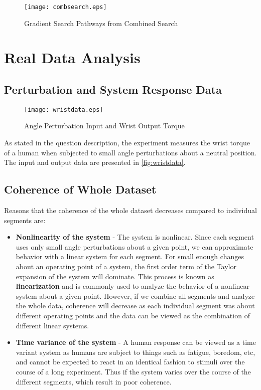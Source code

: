 \documentclass[11pt,a4paper]{article}
\begin{document}
\begin{figure}
    \centering
    \texttt{[image: combsearch.eps]}
    \caption{Gradient Search Pathways from Combined Search}
    \label{fig:combsearch}
\end{figure}

\newpage
{}


\section{Real Data Analysis}

\subsection{Perturbation and System Response Data}
\begin{figure}
    \centering
    \texttt{[image: wristdata.eps]}
    \caption{Angle Perturbation Input and Wrist Output Torque}
    \label{fig:wristdata}
\end{figure}
As stated in the question description, the experiment measures the wrist torque
of a human when subjected to small angle perturbations about a neutral
position. The input and output data are presented in \autoref{fig:wristdata}.

\subsection{Coherence of Whole Dataset}
Reasons that the coherence of the whole dataset decreases compared to
individual segments are:
\begin{itemize}
    \item \textbf{Nonlinearity of the system} - The system is nonlinear. Since
        each segment uses only small angle perturbations about a given point,
        we can approximate behavior with a linear system for each segment. For
        small enough changes about an operating point of a system, the first
        order term of the Taylor expansion of the system will dominate. This
        process is known as \textbf{linearization} and is commonly used to
        analyze the behavior of a nonlinear system about a given point.
        However, if we combine all segments and analyze the whole data,
        coherence will decrease as each individual segment was about different
        operating points and the data can be viewed as the combination of
        different linear systems.
    \item \textbf{Time variance of the system} - A human response can be viewed
        as a time variant system as humans are subject to things such as
        fatigue, boredom, etc, and cannot be expected to react in an identical
        fashion to stimuli over the course of a long experiment. Thus if the
        system varies over the course of the different segments, which result
        in poor coherence.
\end{itemize}
\end{document}
